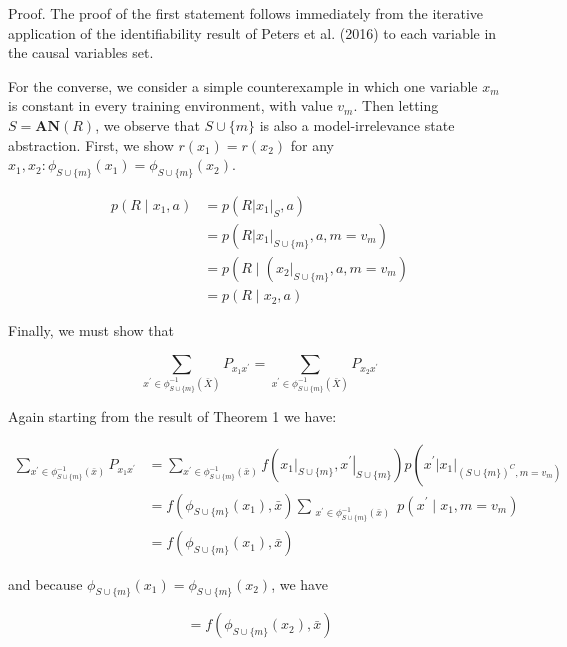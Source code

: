 \documentclass[10pt]{article}
\begin{document}
Proof. The proof of the first statement follows immediately from the iterative application of the identifiability result of Peters et al. (2016) to each variable in the causal variables set.

For the converse, we consider a simple counterexample in which one variable $x_{m}$ is constant in every training environment, with value $v_{m}$. Then letting $S=\mathbf{A} \mathbf{N}(R)$, we observe that $S \cup\{m\}$ is also a model-irrelevance state abstraction. First, we show $r\left(x_{1}\right)=r\left(x_{2}\right)$ for any $x_{1}, x_{2}: \phi_{S \cup\{m\}}\left(x_{1}\right)=\phi_{S \cup\{m\}}\left(x_{2}\right)$.

\[
\begin{aligned}
p\left(R \mid x_{1}, a\right) & =p\left(R\left|x_{1}\right|_{S}, a\right) \\
& =p\left(R\left|x_{1}\right|_{S \cup\{m\}}, a, m=v_{m}\right) \\
& =p\left(R \mid\left(\left.x_{2}\right|_{S \cup\{m\}}, a, m=v_{m}\right)\right. \\
& =p\left(R \mid x_{2}, a\right)
\end{aligned}
\]

Finally, we must show that

\[
\sum_{x^{\prime} \in \phi_{S \cup\{m\}}^{-1}(\bar{X})} P_{x_{1} x^{\prime}}=\sum_{x^{\prime} \in \phi_{S \cup\{m\}}^{-1}(\bar{X})} P_{x_{2} x^{\prime}}
\]

Again starting from the result of Theorem 1 we have:

\[
\begin{aligned}
\sum_{x^{\prime} \in \phi_{S \cup\{m\}}^{-1}(\bar{x})} P_{x_{1} x^{\prime}} & =\sum_{x^{\prime} \in \phi_{S \cup\{m\}}^{-1}(\bar{x})} f\left(\left.x_{1}\right|_{S \cup\{m\}},\left.x^{\prime}\right|_{S \cup\{m\}}\right) p\left(x^{\prime}\left|x_{1}\right|_{\left.(S \cup\{m\})^{C}, m=v_{m}\right)}\right. \\
& =f\left(\phi_{S \cup\{m\}}\left(x_{1}\right), \bar{x}\right) \sum_{\substack{x^{\prime} \in \phi_{S \cup\{m\}}^{-1}(\bar{x})}} p\left(x^{\prime} \mid x_{1}, m=v_{m}\right) \\
& =f\left(\phi_{S \cup\{m\}}\left(x_{1}\right), \bar{x}\right)
\end{aligned}
\]

and because $\phi_{S \cup\{m\}}\left(x_{1}\right)=\phi_{S \cup\{m\}}\left(x_{2}\right)$, we have

\[
=f\left(\phi_{S \cup\{m\}}\left(x_{2}\right), \bar{x}\right)
\]
\end{document}
